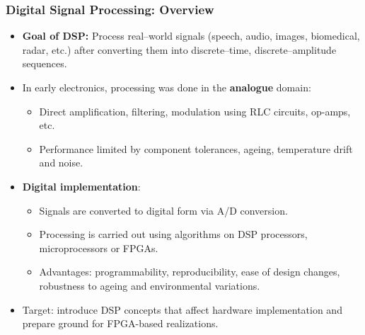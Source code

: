 \begin{frame}
	\frametitle{Digital Signal Processing: Overview}
	\begin{itemize}
		\item \textbf{Goal of DSP:} Process real–world signals (speech, audio, images, biomedical, radar, etc.) after converting them into discrete–time, discrete–amplitude sequences.
		\item In early electronics, processing was done in the \textbf{analogue} domain:
			\begin{itemize}
				\item Direct amplification, filtering, modulation using RLC circuits, op-amps, etc.
				\item Performance limited by component tolerances, ageing, temperature drift and noise.
			\end{itemize}
		\item \textbf{Digital implementation}:
			\begin{itemize}
				\item Signals are converted to digital form via A/D conversion.
				\item Processing is carried out using algorithms on DSP processors, microprocessors or FPGAs.
				\item Advantages: programmability, reproducibility, ease of design changes, robustness to ageing and environmental variations.
			\end{itemize}
		\item Target: introduce DSP concepts that affect hardware implementation and prepare ground for FPGA-based realizations.
	\end{itemize}
\end{frame}

